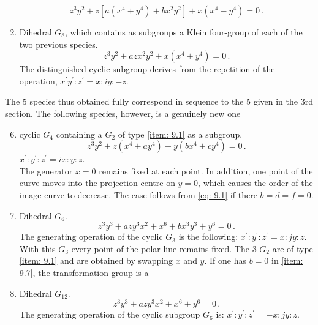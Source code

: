 \documentclass[leqno]{article}
\begin{document}
\begin{enumerate}[label=\arabic*)]
    \begin{equation}\label{eq: 9.4}
        z^3 y^2 + z[a(x^4 + y^4) + bx^2 y^2] + x(x^4 - y^4) = 0 \, . \tag{4}
    \end{equation}
    \item \label{item: 9.5}Dihedral $G_8$, which contains as subgroups a Klein four-group of each of the two previous species.
    \begin{equation}\label{eq: 9.5}
        z^3 y^2 + a z x^2 y^2 + x(x^4 + y^4)= 0 \, . \tag{5}
    \end{equation}
    The distinguished cyclic subgroup derives from the repetition of the operation, $x^\prime y^\prime : z^\prime = x : iy : -z$.
\end{enumerate}
The 5 species thus obtained fully correspond in sequence to the 5 given in the 3rd section. The following species, however, is a genuinely new one
\begin{enumerate}[label=\arabic*)]
    \setcounter{enumi}{5}
    \item \label{item: 9.6}cyclic $G_4$ containing a $G_2$ of type \ref{item: 9.1} as a subgroup.
    \begin{equation}\label{eq: 9.6}
        z^3 y^2 + z(x^4 + a y^4) + y(bx^4 + c y^4) = 0 \, . \tag{6}
    \end{equation}
    $x^\prime : y^\prime : z^\prime = ix : y : z$. \\
    The generator $x=0$ remains fixed at each point. In addition, one point of the curve moves into the projection centre on $y=0$, which causes the order of the image curve to decrease. The case follows from \eqref{eq: 9.1} if there $b=d=f=0$.
    \item \label{item: 9.7}Dihedral $G_6$. 
    \begin{equation}\label{eq: 9.7}
        z^3 y^3 + a z y^3 x^2 + x^6 + b x^3 y^3 + y^6 = 0 \, . \tag{7} 
    \end{equation}
    The generating operation of the cyclic $G_3$ is the following: $x^\prime : y^\prime : z^\prime = x : jy : z$. With this $G_3$ every point of the polar line remains fixed. The 3 $G_2$ are of type \ref{item: 9.1} and are obtained by swapping $x$ and $y$. If one has $b=0$ in \ref{item: 9.7}, the transformation group is a 
    \item \label{item: 9.8}Dihedral $G_{12}$. 
    \begin{equation}\label{eq: 9.8}
        z^3 y^3 + a z y^3 x^2 + x^6 + y^6 = 0 \, . \tag{8}
    \end{equation}
    The generating operation of the cyclic subgroup $G_6$ is: $x^\prime : y^\prime : z^\prime = -x : jy : z$. 
\end{enumerate}
\end{document}
